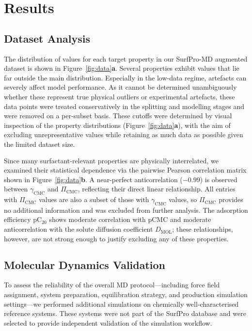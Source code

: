 \documentclass[letterpaper]{article}
\begin{document}
\section{Results}
\label{results}

\subsection{Dataset Analysis}
\label{sec:results:dataset_analysis}

The distribution of values for each target property in our SurfPro-MD augmented dataset is shown in Figure~\ref{fig:data}\textbf{a}. Several properties exhibit values that lie far outside the main distribution. Especially in the low-data regime, artefacts can severely affect model performance. As it cannot be determined unambiguously whether these represent true physical outliers or experimental artefacts, these data points were treated conservatively in the splitting and modelling stages and were removed on a per-subset basis. These cutoffs were
determined by visual inspection of the property distributions (Figure~\ref{fig:data}\textbf{a}), with the aim of excluding unrepresentative values while retaining as much data as possible given the limited dataset size.

Since many surfactant-relevant properties are physically interrelated, we examined their statistical dependence via the pairwise Pearson correlation matrix shown in Figure~\ref{fig:data}\textbf{b}. A near-perfect anticorrelation ($-0.99$) is observed between $\gamma_{\mathrm{CMC}}$ and $\Pi_{\mathrm{CMC}}$, reflecting their direct linear relationship. All entries with $\Pi_{\mathrm{CMC}}$ values are also a subset of those with $\gamma_{\mathrm{CMC}}$ values, so $\Pi_{\mathrm{CMC}}$ provides no additional information and was excluded from further analysis. The adsorption efficiency pC$_{20}$ shows moderate correlation with pCMC and moderate anticorrelation with the solute diffusion coefficient $D_{\mathrm{MOL}}$; these relationships, however, are not strong enough to justify excluding any of these properties.

\subsection{Molecular Dynamics Validation}
\label{sec:results:molecular_dynamics}

To assess the reliability of the overall MD protocol—including force field assignment, system preparation, equilibration strategy, and production simulation settings—we performed additional simulations on chemically well-characterised reference systems. These systems were not part of the SurfPro database and were selected to provide independent validation of the simulation workflow.
\end{document}
